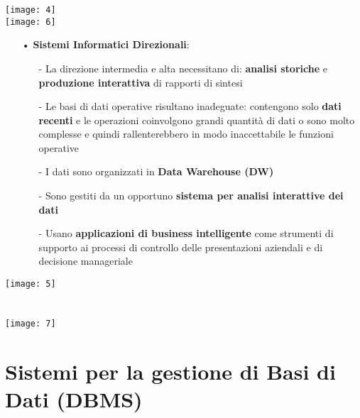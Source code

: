\documentclass[12pt, letterpaper]{article}
\begin{document}
\texttt{[image: 4]}\\
\texttt{[image: 6]}

\begin{itemize}
   \item[•] \textbf{Sistemi Informatici Direzionali}:
      \begin{itemize}
         \item[-] La direzione intermedia e alta necessitano di: \textbf{analisi storiche} e \textbf{produzione interattiva} di rapporti di sintesi
         \item[-] Le basi di dati operative risultano inadeguate: contengono solo \textbf{dati recenti} e le operazioni coinvolgono grandi quantità di dati o sono molto complesse e
quindi rallenterebbero in modo inaccettabile le funzioni operative 
         \item[-] I dati sono organizzati in \textbf{Data Warehouse (DW)}
         \item[-] Sono gestiti da un opportuno \textbf{sistema per analisi interattive dei dati}
         \item[-] Usano \textbf{applicazioni di business intelligente} come strumenti di supporto ai processi di controllo delle presentazioni aziendali e di decisione manageriale
      \end{itemize}
\end{itemize}
\texttt{[image: 5]}\\
\\
\\
\texttt{[image: 7]}

\section{Sistemi per la gestione di Basi di Dati (DBMS)}
\end{document}
